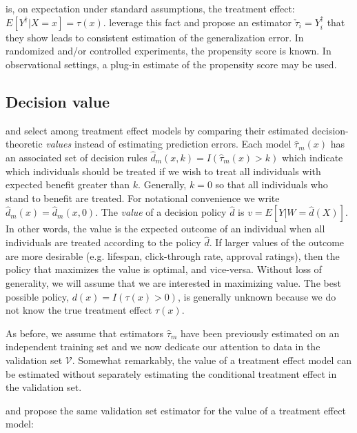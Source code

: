 is, on expectation under standard assumptions, the treatment effect: $E[Y^{\dagger}|X=x] = \tau(x)$. \citet{Gutierrez:2016tq} leverage this fact and propose an estimator $\check \tau_i = Y^{\dagger}_i$ that they show leads to consistent estimation of the generalization error. In randomized and/or controlled experiments, the propensity score is known. In observational settings, a plug-in estimate of the propensity score may be used.


\subsection{Decision value}
\label{sec:value}

\citet{Kapelner:3baXYEjR} and \citet{Zhao:2017wa} select among treatment effect models by comparing their estimated decision-theoretic \emph{values} instead of estimating prediction errors. Each model $\hat\tau_m(x)$ has an associated set of decision rules $\hat d_{m}(x,k) = I(\hat\tau_m(x) > k)$ which indicate which individuals should be treated if we wish to treat all individuals with expected benefit greater than $k$. Generally, $k=0$ so that all individuals who stand to benefit are treated. For notational convenience we write $\hat d_m(x) = \hat d_{m}(x,0)$. The \emph{value} of a decision policy $\hat d$ is $v = E[Y|W=\hat d(X)]$. In other words, the value is the expected outcome of an individual when all individuals are treated according to the policy $\hat d$. If larger values of the outcome are more desirable (e.g. lifespan, click-through rate, approval ratings), then the policy that maximizes the value is optimal, and vice-versa. Without loss of generality, we will assume that we are interested in maximizing value. The best possible policy, $d(x) = I(\tau(x) > 0)$, is generally unknown because we do not know the true treatment effect $\tau(x)$. 

As before, we assume that estimators $\hat\tau_m$ have been previously estimated on an independent training set and we now dedicate our attention to data in the validation set $\mathcal{V}$. Somewhat remarkably, the value of a treatment effect model can be estimated without separately estimating the conditional treatment effect in the validation set.

\citet{Kapelner:3baXYEjR} and \citet{Zhao:2017wa} propose the same validation set estimator for the value of a treatment effect model:

